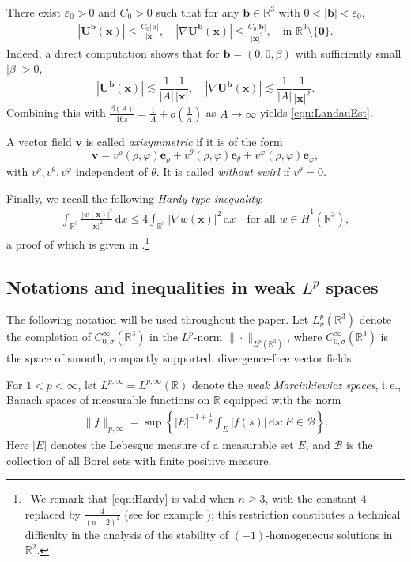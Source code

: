 \documentclass[10pt]{amsart}
\theoremstyle{plain}
\theoremstyle{definition}
\theoremstyle{remark}
\numberwithin{equation}{section}
\newcommand{\R}{\mathbb{R}}
\newcommand{\bx}{\boldsymbol{x}}
\newcommand{\bb}{{\boldsymbol{b}}}
\newcommand{\be}{{\boldsymbol{e}}}
\newcommand{\bv}{{\boldsymbol{v}}}
\newcommand{\bU}{{\boldsymbol{U}}}
\newcommand{\vp}{\varphi}
\newcommand{\ve}{\varepsilon}
\begin{document}
There exist $\ve_0>0$ and $C_0>0$ such that for any $\bb \in \R^3$ with $0 < |\bb| < \ve_0$, 
\begin{align}\label{eqn:LandauEst}
    |\bU^\bb(\bx)|\le\frac{C_0|\bb|}{|\bx|},\quad |\nabla \bU^\bb(\bx)|\le\frac{C_0|\bb|}{|\bx|^2},\quad \text{in }\R^3\setminus\{\mathbf0\}.
\end{align}
Indeed, a direct computation shows that for $\bb=(0,0,\beta)$ with sufficiently small $|\beta|>0$,
\[
|\bU^\bb(\bx)| \lesssim \frac{1}{|A|} \frac{1}{|\bx|},\quad
|\nabla \bU^\bb(\bx)| \lesssim \frac{1}{|A|} \frac{1}{|\bx|^2}.
\]
Combining this with $\frac{\beta(A)}{16 \pi}=\frac{1}{A}+o(\frac{1}{A})$ as $A\to \infty$ yields \eqref{eqn:LandauEst}.

A vector field $\bv$ is called \emph{axisymmetric} if it is of the form
\[
\bv=v^\rho(\rho,\vp) \be_\rho + v^\theta(\rho,\vp) \be_\theta + v^\vp(\rho,\vp) \be_\vp,
\]
with $v^\rho, v^\theta, v^\vp$ independent of $\theta$. 
It is called \emph{without swirl} if $v^\theta = 0$.


Finally, we recall the following \textit{Hardy-type inequality}:
\begin{align}\label{eqn:Hardy}
    \int_{\R^3} \frac{|w(\bx)|^2}{|\bx|^2}\, \mathrm{d}x \le 4 \int_{\R^3} |\nabla w(\bx)|^2 \, \mathrm{d}x \quad \text{for all } w\in \dot{H}^1(\R^3),
\end{align}
a proof of which is given in \cite[Chapter I.6]{Leray1934}.\footnote{~We remark that \cref{eqn:Hardy} is valid when $n\ge 3$, with the constant $4$ replaced by $\frac{4}{(n-2)^2}$  (see for example \cite[Theorem 2.1]{AGG2006}); this restriction constitutes a technical difficulty in the analysis of the stability of $(-1)$-homogeneous solutions in $\mathbb R^2$.}

\subsection{Notations and inequalities in weak \texorpdfstring{$L^p$}{Lp} spaces}
\label{ssec:weakLpspace}

The following notation will be used throughout the paper. Let $L^p_\sigma(\mathbb{R}^3)$ denote the completion of $C_{0,\sigma}^{\infty}(\mathbb{R}^3)$ in the $L^p$-norm $\|\cdot\|_{L^p(\mathbb{R}^3)}$, where $C_{0,\sigma}^{\infty}(\mathbb{R}^3)$ is the space of smooth, compactly supported, divergence-free vector fields.

For $1<p<\infty$, let $L^{p,\infty}=L^{p,\infty}(\mathbb{R})$ denote the \textit{weak Marcinkiewicz spaces}, i.\,e., Banach spaces of measurable functions on $\mathbb{R}$ equipped with the norm
\begin{align}\label{eqn:weakLpnorm}
\|f\|_{p,\infty}= \sup
\left\{|E|^{-1+\frac{1}{p}} \int_E |f(s)| \, \mathrm{d}s: E \in \mathcal{B}\right\}.
\end{align}
Here $|E|$ denotes the Lebesgue measure of a measurable set $E$, and $\mathcal{B}$ is the collection of all Borel sets with finite positive measure.
\end{document}

